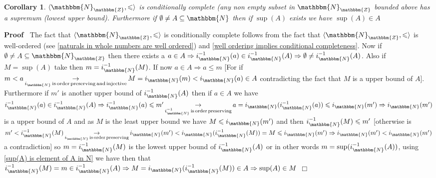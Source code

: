 \documentclass{book}
\newcommand{\Rightarrowlim}{\mathop{\rightarrow}\limits}
\newcommand{\tmop}[1]{\ensuremath{\operatorname{#1}}}
\newenvironment{proof}{\noindent\textbf{Proof\ }}{\hspace*{\fill}$\Box$\medskip}
\newtheorem{corollary}{Corollary}
\begin{document}
{{\begin{corollary}
  \label{the naturals embedded in the integers are conditionally
  complete}$\langle \mathbbm{N}_{\mathbbm{Z}}, \leqslant \rangle$ is
  conditionally complete (any non empty subset in $\mathbbm{N}_{\mathbbm{Z}}$
  bounded above has a supremum (lowest upper bound). Furthermore if $\emptyset
  \neq A \subseteq \mathbbm{N}$ then if $\sup (A)$ exists we have $\sup (A)
  \in A$
\end{corollary}

\begin{proof}
  The fact that $\langle \mathbbm{N}_{\mathbbm{Z}}, \leqslant \rangle$ is
  conditionally complete follows from the fact that $\langle
  \mathbbm{N}_{\mathbbm{Z}}, \leqslant \rangle$ is well-ordered (see
  \ref{naturals in whole numbers are well ordered}) and \ref{well ordering
  implies conditional completeness}. Now if $\emptyset \neq A \subseteq
  \mathbbm{N}_{\mathbbm{Z}}$ then there exists a $a \in A \Rightarrow
  i_{\mathbbm{N}}^{- 1} (a) \in i_{\mathbbm{N}}^{- 1} (A) \Rightarrow
  \emptyset \neq i_{\mathbbm{N}}^{- 1} (A)$. Also if $M = \sup (A)$ take then
  $m = i_{\mathbbm{N}}^{- 1} (M)$. If now $a \in A \Rightarrow a \leqslant m$
  [For if $m < a \Rightarrowlim_{i_{\mathbbm{N}} \tmop{is} \tmop{order}
  \tmop{preserving} \tmop{and} \tmop{injective}} M = i_{\mathbbm{N}} (m) <
  i_{\mathbbm{N}} (a) \in A$ contradicting the fact that $M$ is a upper bound
  of $A$]. Furthermore if $m'$ is another upper bound of $i_{\mathbbm{N}}^{-
  1} (A)$ then if $a \in A$ we have $i_{\mathbbm{N}}^{- 1} (a) \in
  i_{\mathbbm{N}}^{- 1} (A) \Rightarrow i_{\mathbbm{N}}^{- 1} (a) \leqslant m'
  \Rightarrowlim_{i_{\mathbbm{N}}^{- 1} \tmop{is} \tmop{order}
  \tmop{preserving}} a = i_{\mathbbm{N}} (i_{\mathbbm{N}}^{- 1} (a)) \leqslant
  i_{\mathbbm{N}} (m') \Rightarrow i_{\mathbbm{N}} (m')$ is a upper bound of
  $A$ and as $M$ is the least upper bound we have $M \leqslant i_{\mathbbm{N}}
  (m')$ and then $i_{\mathbbm{N}}^{- 1} (M) \leqslant m'$ [otherwise is $m' <
  i_{\mathbbm{N}}^{- 1} (M) \Rightarrowlim_{i_{\mathbbm{N}} \tmop{is}
  \tmop{order} \tmop{preserving}} i_{\mathbbm{N}} (m') < i_{\mathbbm{N}}
  (i_{\mathbbm{N}}^{- 1} (M)) = M \leqslant i_{\mathbbm{N}} (m') \Rightarrow
  i_{\mathbbm{N}} (m') < i_{\mathbbm{N}} (m')$ a contradiction] so $m =
  i_{\mathbbm{N}}^{- 1} (M)$ is the lowest upper bound of $i_{\mathbbm{N}}^{-
  1} (A)$ or in other words $m = \sup (i_{\mathbbm{N}}^{- 1} (A))$, using
  \ref{sup(A) is element of A in N} we have then that $i_{\mathbbm{N}}^{- 1}
  (M) = m \in i_{\mathbbm{N}}^{- 1} (A) \Rightarrow M = i_{\mathbbm{N}}
  (i_{\mathbbm{N}}^{- 1} (M)) \in A \Rightarrow \sup (A) \in M$
\end{proof}

}}
\end{document}
